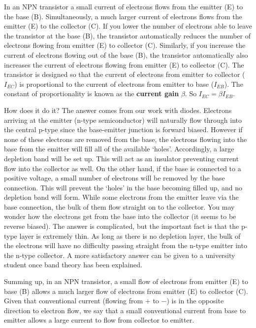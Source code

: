 In an NPN transistor a small current of electrons flows from the emitter (E) to the base (B).  Simultaneously, a much larger current of electrons flows from the emitter (E) to the collector (C).  If you lower the number of electrons able to leave the transistor at the base (B), the transistor automatically reduces the number of electrons flowing from emitter (E) to collector (C).  Similarly, if you increase the current of electrons flowing out of the base (B), the transistor automatically also increases the current of electrons flowing from emitter (E) to collector (C).  The transistor is designed so that the current of electrons from emitter to collector ($I_{EC}$) is proportional to the current of electrons from emitter to base ($I_{EB}$).  The constant of proportionality is known as the {\bf current gain} $\beta$.  So $I_{EC} = \beta I_{EB}$.

How does it do it?  The answer comes from our work with diodes.  Electrons arriving at the emitter (n-type semiconductor) will naturally flow through into the central p-type since the base-emitter junction is forward biased.  However if none of these electrons are removed from the base, the electrons flowing into the base from the emitter will fill all of the available `holes'.  Accordingly, a large depletion band will be set up.  This will act as an insulator preventing current flow into the collector as well.  On the other hand, if the base is connected to a positive voltage, a small number of electrons will be removed by the base connection.  This will prevent the `holes' in the base becoming filled up, and no depletion band will form. While some electrons from the emitter leave via the base connection, the bulk of them flow straight on to the collector.  You may wonder how the electrons get from the base into the collector (it seems to be reverse biased).  The answer is complicated, but the important fact is that the p-type layer is extremely thin.  As long as there is no depletion layer, the bulk of the electrons will have no difficulty passing straight from the n-type emitter into the n-type collector.  A more satisfactory answer can be given to a university student once band theory has been explained.

Summing up, in an NPN transistor, a small flow of electrons from emitter (E) to base (B) allows a much larger flow of electrons from emitter (E) to collector (C).  Given that conventional current (flowing from $+$ to $-$) is in the opposite direction to electron flow, we say that a small conventional current from base to emitter allows a large current to flow from collector to emitter.

